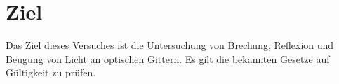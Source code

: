 \section{Ziel}
\label{sec:Ziel}
Das Ziel dieses Versuches ist die Untersuchung von Brechung, Reflexion und Beugung von Licht an optischen Gittern.
Es gilt die bekannten Gesetze auf Gültigkeit zu prüfen.